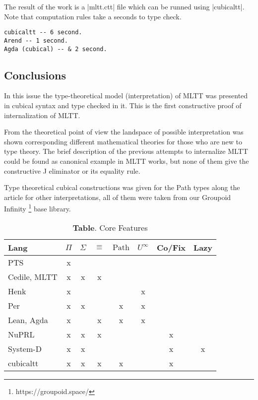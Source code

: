 \documentclass{article}
\theoremstyle{definition}
\begin{document}
The result of the work is a |mltt.ctt| file which can be runned using |cubicaltt|.
Note that computation rules take a seconds to type check.

\begin{lstlisting}
cubicaltt -- 6 second.
Arend -- 1 second.
Agda (cubical) -- & 2 second.
\end{lstlisting}

\subsection*{Conclusions}

In this issue the type-theoretical model (interpretation) of MLTT was
presented in cubical syntax and type checked in it.
This is the first constructive proof of internalization of MLTT.

From the theoretical point of view the landspace of possible interpretation was shown
corresponding different mathematical theories for those who are new to type theory.
The brief description of the previous attempts to internalize MLTT could
be found as canonical example in MLTT works, but none of them give the constructive
J eliminator or its equality rule.

Type theoretical cubical constructions was given for the Path types
along the article for other interpretations, all of them were taken
from our Groupoid Infinity \footnote{https://groupoid.space/} base library.

\begin{table}[!ht]
  \centering
  \caption*{\textbf{Table}. Core Features}
  \begin{adjustbox}{width=\columnwidth,center}
  \begin{tabular}{lccccccc}
    \hline
       Lang          & $\Pi$ & $\Sigma$ & $\equiv$ & $\text{Path}$ & $U^{\infty}$ & Co/Fix & Lazy\\
    \hline
       PTS           & x \\
       Cedile, MLTT  & x & x & x \\
       Henk          & x &   &   &   & x \\
       Per           & x & x &   & x & x \\
       Lean, Agda    & x &   & x & x & x  \\
       NuPRL         & x & x & x &   &   & x \\
       System-D      & x & x &   &   &   & x & x\\
       cubicaltt     & x & x & x & x &   & x \\
  \end{tabular}
  \end{adjustbox}
\end{table}
\end{document}
